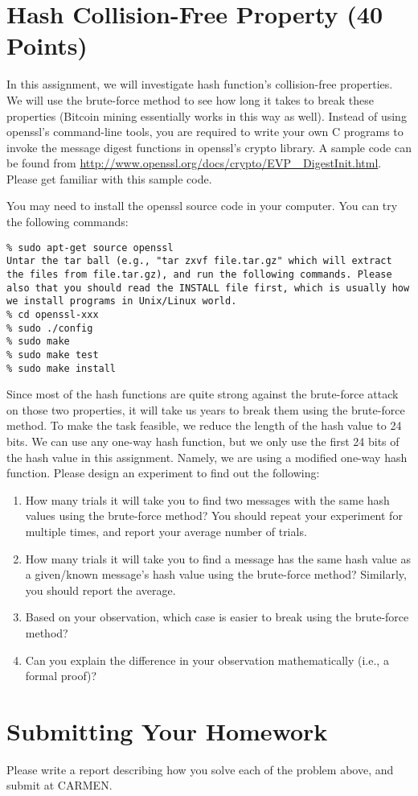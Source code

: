 \documentclass[11pt]{article}
\begin{document}
\section{Hash Collision-Free Property (40 Points)}

In this assignment, we will investigate hash function's collision-free properties. We will use the brute-force
method to see how long it takes to break these properties (Bitcoin mining essentially works in this way as well). Instead of using openssl's command-line tools, you are required to write your own C programs to invoke the message digest functions in openssl's crypto library. A sample code can be found from \url{http://www.openssl.org/docs/crypto/EVP_
DigestInit.html}. Please get familiar with this sample code.

You may need to install the openssl source code in your computer. You can try the following commands:
\begin{lstlisting}
% sudo apt-get source openssl
Untar the tar ball (e.g., "tar zxvf file.tar.gz" which will extract the files from file.tar.gz), and run the following commands. Please also that you should read the INSTALL file first, which is usually how we install programs in Unix/Linux world.
% cd openssl-xxx
% sudo ./config
% sudo make
% sudo make test
% sudo make install
\end{lstlisting}


Since most of the hash functions are quite strong against the brute-force attack on those two properties,
it will take us years to break them using the brute-force method. To make the task feasible, we reduce the
length of the hash value to 24 bits. We can use any one-way hash function, but we only use the first 24 bits
of the hash value in this assignment. Namely, we are using a modified one-way hash function. Please design an
experiment to find out the following:
\begin{enumerate}
\item How many trials it will take you to find two messages with the same hash values using the brute-force
method? You should repeat your experiment for multiple times, and report your average number of
trials.
\item How many trials it will take you to find a message has the same hash value as a given/known message's
hash value using the brute-force method? Similarly, you should report the average.
\item Based on your observation, which case is easier to break using the brute-force method?
\item Can you explain the difference in your observation mathematically (i.e., a formal
proof)?
\end{enumerate}

 
\section{Submitting Your Homework}
Please write a report describing how you solve each of the problem above, and submit at CARMEN.
\end{document}
